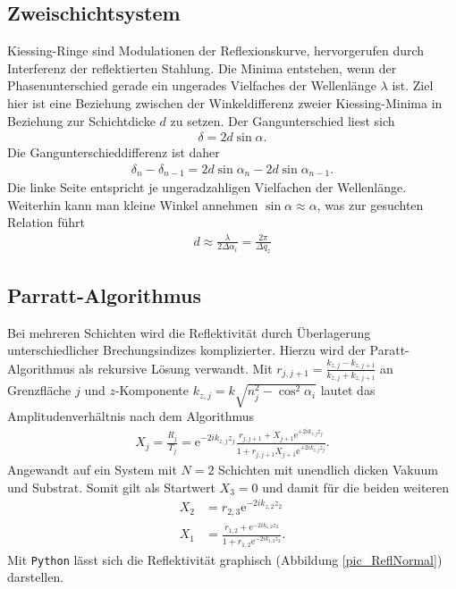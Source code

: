 \subsection{Zweischichtsystem}
Kiessing-Ringe sind Modulationen der Reflexionskurve, hervorgerufen durch Interferenz der reflektierten Stahlung. Die Minima entstehen, wenn der 
Phasenunterschied gerade ein ungerades Vielfaches der Wellenlänge $\lambda$ ist. Ziel hier ist eine Beziehung zwischen der Winkeldifferenz zweier Kiessing-Minima 
in Beziehung zur Schichtdicke $d$ zu setzen. Der Gangunterschied liest sich
\begin{align}
 \delta = 2 d \sin\alpha.
\end{align}
Die Gangunterschieddifferenz ist daher
\begin{align}
 \delta_n -\delta_{n-1}= 2 d \sin\alpha_n - 2d\sin\alpha_{n-1}.
\end{align}
Die linke Seite entspricht je ungeradzahligen Vielfachen der Wellenlänge. Weiterhin kann man kleine Winkel annehmen $\sin\alpha \approx \alpha$, was zur
gesuchten Relation führt
\begin{align}
 d \approx \frac{\lambda}{2\Delta\alpha_i} = \frac{2\pi}{\Delta q_z}
\end{align}

\subsection{Parratt-Algorithmus}
Bei mehreren Schichten wird die Reflektivität durch Überlagerung unterschiedlicher Brechungsindizes komplizierter. Hierzu wird der Paratt-Algorithmus als
rekursive Lösung verwandt. Mit $r_{j,j+1} = \frac{k_{z,j}-k_{z,j+1}}{k_{z,j}+k_{z,j+1}}$ an Grenzfläche $j$ und $z$-Komponente $k_{z,j} = k\sqrt{n_j^2-\cos^2\alpha_i}$
lautet das Amplitudenverhältnis nach dem Algorithmus
\begin{align}
 X_j = \frac{R_j}{T_j} = \text{e}^{-2ik_{z,j}z_j}\frac{r_{j,j+1} + X_{j+1} \text{e}^{+2ik_{z,j}z_j}}{1 + r_{j,j+1} X_{j+1}\text{e}^{+2ik_{z,j}z_j}}.
\end{align}
Angewandt auf ein System mit $N=2$ Schichten mit unendlich dicken Vakuum und Substrat. Somit gilt als Startwert $X_3 = 0$ und damit für die beiden weiteren
\begin{align}
 X_2 &= r_{2,3}\text{e}^{-2ik_{z,2}z_2}\\
 X_1 &= \frac{r_{1,2}+\text{e}^{-2ik_{z,2}z_2}}{1+r_{1,2}\text{e}^{-2ik_{z,2}z_2}}.
\end{align}
Mit \texttt{Python} lässt sich die Reflektivität graphisch (Abbildung \ref{pic_ReflNormal}) darstellen.

